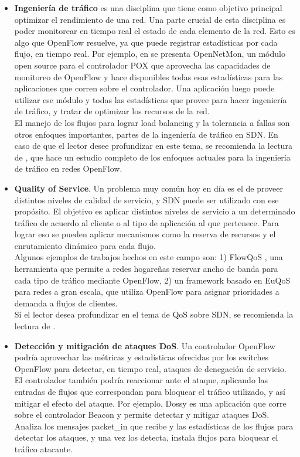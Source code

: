 \begin{itemize}
	\item \textbf{Ingeniería de tráfico} es una disciplina que tiene como objetivo principal optimizar el rendimiento de una red. Una parte crucial de esta disciplina es poder monitorear en tiempo real el estado de cada elemento de la red. Esto es algo que OpenFlow resuelve, ya que puede registrar estadísticas por cada flujo, en tiempo real. Por ejemplo, en \cite{opennetmon} se presenta OpenNetMon, un módulo open source para el controlador POX que aprovecha las capacidades de monitoreo de OpenFlow y hace disponibles todas esas estadísticas para las aplicaciones que corren sobre el controlador. Una aplicación luego puede utilizar ese módulo y todas las estadísticas que provee para hacer ingeniería de tráfico, y tratar de optimizar los recursos de la red. \\
	El manejo de los flujos para lograr load balancing y la tolerancia a fallas son otros enfoques importantes, partes de la ingeniería de tráfico en SDN. En caso de que el lector desee profundizar en este tema, se recomienda la lectura de \cite{roadmap-sdn-te}, que hace un estudio completo de los enfoques actuales para la ingeniería de tráfico en redes OpenFlow.
	\item \textbf{Quality of Service}. Un problema muy común hoy en día es el de proveer distintos niveles de calidad de servicio, y SDN puede ser utilizado con ese propósito. El objetivo es aplicar distintos niveles de servicio a un determinado tráfico de acuerdo al cliente o al tipo de aplicación al que pertenece. Para lograr eso se pueden aplicar mecanismos como la reserva de recursos y el enrutamiento dinámico para cada flujo. \\
	Algunos ejemplos de trabajos hechos en este campo son: 1) FlowQoS \cite{flowqos}, una herramienta que permite a redes hogareñas reservar ancho de banda para cada tipo de tráfico mediante OpenFlow, 2) un framework basado en EuQoS \cite{euqos} para redes a gran escala, que utiliza OpenFlow para asignar prioridades a demanda a flujos de clientes. \\
	Si el lector desea profundizar en el tema de QoS sobre SDN, se recomienda la lectura de \cite{survey-sdn-qos}.
	\item \textbf{Detección y mitigación de ataques DoS}. Un controlador OpenFlow podría aprovechar las métricas y estadísticas ofrecidas por los switches OpenFlow para detectar, en tiempo real, ataques de denegación de servicio. El controlador también podría reaccionar ante el ataque, aplicando las entradas de flujos que correspondan para bloquear el tráfico utilizado, y así mitigar el efecto del ataque. Por ejemplo, Dossy \cite{openflow-dos-dossy} es una aplicación que corre sobre el controlador Beacon y permite detectar y mitigar ataques DoS. Analiza los mensajes packet\_in que recibe y las estadísticas de los flujos para detectar los ataques, y una vez los detecta, instala flujos para bloquear el tráfico atacante.
\end{itemize}

